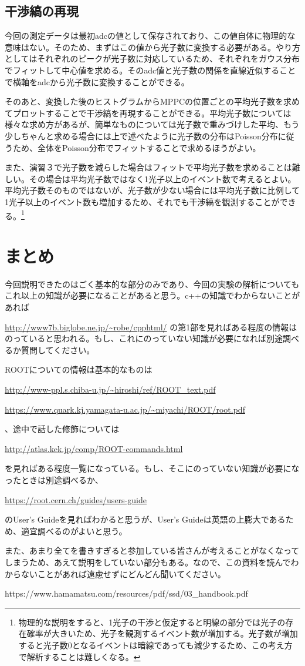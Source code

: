 \documentclass[10pt]{ujarticle}
\begin{document}
\subsection{干渉縞の再現}
今回の測定データは最初adcの値として保存されており、この値自体に物理的な意味はない。そのため、まずはこの値から光子数に変換する必要がある。やり方としてはそれぞれのピークが光子数に対応しているため、それぞれをガウス分布でフィットして中心値を求める。そのadc値と光子数の関係を直線近似することで横軸をadcから光子数に変換することができる。

そのあと、変換した後のヒストグラムからMPPCの位置ごとの平均光子数を求めてプロットすることで干渉縞を再現することができる。平均光子数については様々な求め方があるが、簡単なものについては光子数で重みづけした平均、もう少しちゃんと求める場合には上で述べたように光子数の分布はPoisson分布に従うため、全体をPoisson分布でフィットすることで求めるほうがよい。

また、演習３で光子数を減らした場合はフィットで平均光子数を求めることは難しい。その場合は平均光子数ではなく1光子以上のイベント数で考えるとよい。平均光子数そのものではないが、光子数が少ない場合には平均光子数に比例して1光子以上のイベント数も増加するため、それでも干渉縞を観測することができる。\footnote{物理的な説明をすると、1光子の干渉と仮定すると明線の部分では光子の存在確率が大きいため、光子を観測するイベント数が増加する。光子数が増加すると光子数0となるイベントは暗線であっても減少するため、この考え方で解析することは難しくなる。}

\section{まとめ}
\label{sec:lastsection}
今回説明できたのはごく基本的な部分のみであり、今回の実験の解析についてもこれ以上の知識が必要になることがあると思う。c++の知識でわからないことがあれば

\url{http://www7b.biglobe.ne.jp/~robe/cpphtml/}
の第1部を見ればある程度の情報はのっていると思われる。もし、これにのっていない知識が必要になれば別途調べるか質問してください。

ROOTについての情報は基本的なものは

\url{http://www-ppl.s.chiba-u.jp/~hiroshi/ref/ROOT_text.pdf}

\url{https://www.quark.kj.yamagata-u.ac.jp/~miyachi/ROOT/root.pdf}

、途中で話した修飾については

\url{http://atlas.kek.jp/comp/ROOT-commands.html}　

を見ればある程度一覧になっている。もし、そこにのっていない知識が必要になったときは別途調べるか、

\url{https://root.cern.ch/guides/users-guide}

のUser's Guideを見ればわかると思うが、User's Guideは英語の上膨大であるため、適宜調べるのがよいと思う。

また、あまり全てを書きすぎると参加している皆さんが考えることがなくなってしまうため、あえて説明をしていない部分もある。なので、この資料を読んでわからないことがあれば遠慮せずにどんどん聞いてください。

\begin{thebibliography}{9}
https://www.hamamatsu.com/resources/pdf/ssd/03\_handbook.pdf
\end{thebibliography}
\end{document}
